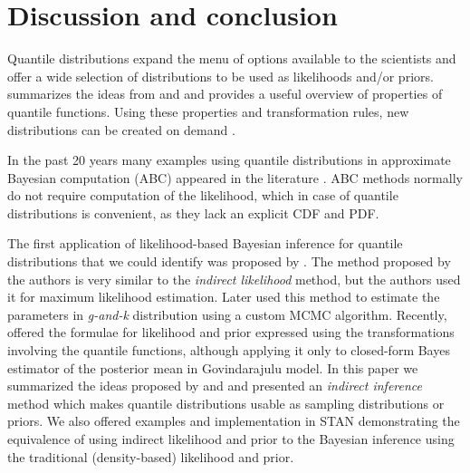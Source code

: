 \documentclass[ba]{imsart}
\numberwithin{equation}{section}
\theoremstyle{plain}
\begin{document}
\hypertarget{discussion-and-conclusion}{%
\section{Discussion and conclusion}\label{discussion-and-conclusion}}

Quantile distributions expand the menu of options available to the scientists and offer a wide selection of distributions to be used as likelihoods and/or priors. \citet{hadlock2017QuantileparameterizedMethodsQuantifying} summarizes the ideas from \citet{gilchrist2000StatisticalModellingQuantile} and \citet{powley2013QuantileFunctionMethods} and provides a useful overview of properties of quantile functions. Using these properties and transformation rules, new distributions can be created on demand \citep{rodrigues2020FlexibleProcedureFormulating, midhu2014ClassDistributionsLinear, sankaran2016NewQuantileFunction, sankaran2018NewClassQuantile, yang2009QuantileBasedDistributionsModelling, smithson2017CDFquantileDistributionsModelling}.

In the past 20 years many examples using quantile distributions in approximate Bayesian computation (ABC) appeared in the literature \citetext{\citealp{allingham2009BayesianEstimationQuantile}; \citealp{drovandi2011LikelihoodfreeBayesianEstimation}; \citealp{dunson2005ApproximateBayesianInference}; \citealp{mcvinish2012ImprovingABCQuantile}; \citealp[and][]{smithson2017CDFquantileDistributionsModelling}}. ABC methods normally do not require computation of the likelihood, which in case of quantile distributions is convenient, as they lack an explicit CDF and PDF.

The first application of likelihood-based Bayesian inference for quantile distributions that we could identify was proposed by \citet{rayner2002NumericalMaximumLikelihood}. The method proposed by the authors is very similar to the \emph{indirect likelihood} method, but the authors used it for maximum likelihood estimation. Later \citet{haynes2005BayesianEstimationGandk} used this method to estimate the parameters in \emph{g-and-k} distribution using a custom MCMC algorithm. Recently, \citet{nair2020BayesianInferenceQuantile} offered the formulae for likelihood and prior expressed using the transformations involving the quantile functions, although applying it only to closed-form Bayes estimator of the posterior mean in Govindarajulu model. In this paper we summarized the ideas proposed by \citet{rayner2002NumericalMaximumLikelihood} and \citet{nair2020BayesianInferenceQuantile} and presented an \emph{indirect inference} method which makes quantile distributions usable as sampling distributions or priors. We also offered examples and implementation in STAN demonstrating the equivalence of using indirect likelihood and prior to the Bayesian inference using the traditional (density-based) likelihood and prior.
\end{document}
